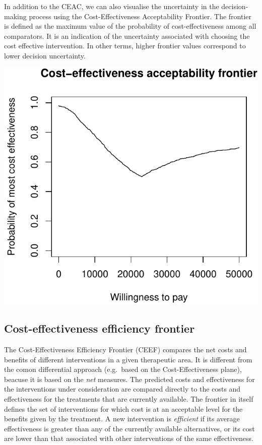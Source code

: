 \documentclass[]{article}
\begin{document}
In addition to the CEAC, we can also visualise the uncertainty in the
decision-making process using the Cost-Effectiveness Acceptability
Frontier. The frontier is defined as the maximum value of the
probability of cost-effectiveness among all comparators. It is an
indication of the uncertainty associated with choosing the cost
effective intervention. In other terms, higher frontier values
correspond to lower decision uncertainty.

\begin{center}\includegraphics{report_files/figure-latex/unnamed-chunk-6-1} \end{center}

\hypertarget{cost-effectiveness-efficiency-frontier}{%
\subsection{Cost-effectiveness efficiency
frontier}\label{cost-effectiveness-efficiency-frontier}}

The Cost-Effectiveness Efficiency Frontier (CEEF) compares the net costs
and benefits of different interventions in a given therapeutic area. It
is different from the comon differential approach (e.g.~based on the
Cost-Effectiveness plane), beacuse it is based on the \emph{net}
measures. The predicted costs and effectiveness for the interventions
under consideration are compared directly to the costs and effectiveness
for the treatments that are currently available. The frontier in itself
defines the set of interventions for which cost is at an acceptable
level for the benefits given by the treatment. A new intervention is
\emph{efficient} if its average effectiveness is greater than any of the
currently available alternatives, or its cost are lower than that
associated with other interventions of the same effectiveness.
\end{document}
